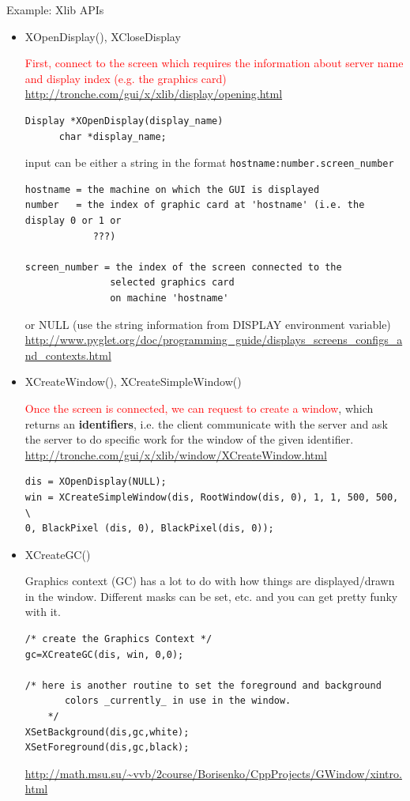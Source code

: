 Example: Xlib APIs
\begin{itemize}
  \item XOpenDisplay(), XCloseDisplay

\textcolor{red}{First, connect to the screen which requires the information
about server name and display index (e.g. the graphics card)}
\url{http://tronche.com/gui/x/xlib/display/opening.html}
\begin{verbatim}
Display *XOpenDisplay(display_name)
      char *display_name;
\end{verbatim}  
input can be either a string in the format \verb!hostname:number.screen_number!
\begin{verbatim}
hostname = the machine on which the GUI is displayed
number   = the index of graphic card at 'hostname' (i.e. the display 0 or 1 or
            ???)

screen_number = the index of the screen connected to the
               selected graphics card
               on machine 'hostname'
\end{verbatim}
or NULL (use the string information from DISPLAY environment
variable) 
\url{http://www.pyglet.org/doc/programming_guide/displays_screens_configs_and_contexts.html}

  \item XCreateWindow(), XCreateSimpleWindow()
  
\textcolor{red}{Once the screen is connected, we can request to create a
window}, which returns an {\bf identifiers}, i.e. the client communicate with
the server and ask the server to do specific work for the window of the
given identifier.
\url{http://tronche.com/gui/x/xlib/window/XCreateWindow.html}

\begin{verbatim}
dis = XOpenDisplay(NULL);
win = XCreateSimpleWindow(dis, RootWindow(dis, 0), 1, 1, 500, 500, \
0, BlackPixel (dis, 0), BlackPixel(dis, 0));
\end{verbatim}

  \item XCreateGC()

Graphics context (GC) has a lot to do with how things are displayed/drawn in the
window. Different masks can be set, etc. and you can get pretty funky with it.
\begin{verbatim}
/* create the Graphics Context */
gc=XCreateGC(dis, win, 0,0);    

/* here is another routine to set the foreground and background
	   colors _currently_ in use in the window.
	*/
XSetBackground(dis,gc,white);
XSetForeground(dis,gc,black);
\end{verbatim}
\url{http://math.msu.su/~vvb/2course/Borisenko/CppProjects/GWindow/xintro.html}


\end{itemize}
